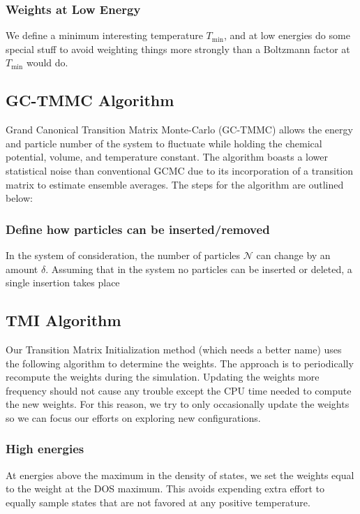 \documentclass[letterpaper,twocolumn,amsmath,amssymb,pre,aps,10pt]{revtex4-1}
\begin{document}
\subsubsection{Weights at Low Energy}
We define a minimum interesting temperature $T_{\min}$, and at low
energies do some special stuff to avoid weighting things more
strongly than a Boltzmann factor at $T_{\min}$ would do.

\subsection{GC-TMMC Algorithm}

Grand Canonical Transition Matrix Monte-Carlo (GC-TMMC) allows the energy and 
particle number of the system to fluctuate while holding the chemical potential,
volume, and temperature constant.  The algorithm boasts a lower statistical noise 
than conventional GCMC due to its incorporation of a transition matrix to estimate
ensemble averages.  The steps for the algorithm are outlined below:

\subsubsection{Define how particles can be inserted/removed}

In the system of consideration, the number of particles $\mathcal{N}$ can change
by an amount $\delta$.  Assuming that in the system no particles can be inserted
or deleted, a single insertion takes place


\subsection{TMI Algorithm}

Our Transition Matrix Initialization method (which needs a better
name) uses the following algorithm to determine the weights.  The
approach is to periodically recompute the weights during the
simulation.  Updating the weights more frequency should not cause any
trouble except the CPU time needed to compute the new weights.  For
this reason, we try to only occasionally update the weights so we can
focus our efforts on exploring new configurations.

\subsubsection{High energies}
At energies above the maximum in the density of states, we set
the weights equal to the weight at the DOS maximum.  This avoids
expending extra effort to equally sample states that are not favored
at any positive temperature.
\end{document}
